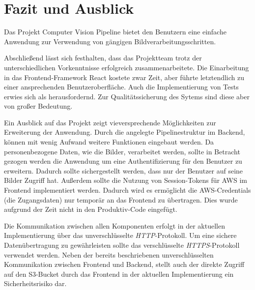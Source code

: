 \section{Fazit und Ausblick}
Das Projekt Computer Vision Pipeline bietet den Benutzern eine einfache Anwendung zur Verwendung von gängigen Bildverarbeitungsschritten.

Abschließend lässt sich festhalten, dass das Projektteam trotz der unterschiedlichen Vorkenntnisse erfolgreich zusammenarbeitete. Die Einarbeitung in das Frontend-Framework React kostete zwar Zeit, aber führte letztendlich zu einer ansprechenden Benutzeroberfläche. Auch die Implementierung von Tests erwies sich als herausfordernd. Zur Qualitätssicherung des Sytems sind diese aber von großer Bedeutung.

Ein Ausblick auf das Projekt zeigt vieversprechende Möglichkeiten zur Erweiterung der Anwendung. Durch die angelegte Pipelinestruktur im Backend, können mit wenig Aufwand weitere Funktionen eingebaut werden. Da personenbezogene Daten, wie die Bilder, verarbeitet werden, sollte in Betracht gezogen werden die Anwendung um eine Authentifizierung für den Benutzer zu erweitern. Dadurch sollte sichergestellt werden, dass nur der Benutzer auf seine Bilder Zugriff hat. Außerdem sollte die Nutzung von Session-Tokens für AWS im Frontend implementiert werden. Dadurch wird es ermöglicht die AWS-Credentials (die Zugangsdaten) nur temporär an das Frontend zu übertragen. Dies wurde aufgrund der Zeit nicht in den Produktiv-Code eingefügt. 

Die Kommunikation zwischen allen Komponenten erfolgt in der aktuellen Implementierung über das unverschlüsselte \textit{HTTP}-Protokoll. Um eine sichere Datenübertragung zu gewährleisten sollte das verschlüsselte \textit{HTTPS}-Protokoll verwendet werden. Neben der bereits beschriebenen unverschlüsselten Kommunikation zwischen Frontend und Backend, stellt auch der direkte Zugriff auf den S3-Bucket durch das Frontend in der aktuellen Implementierung ein Sicherheitsrisiko dar.